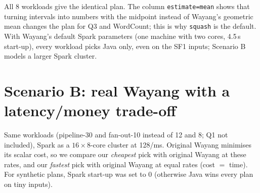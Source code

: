 \documentclass[10pt,a4paper]{article}
\begin{document}
\begin{table}[h]\centering\small
\caption{Scenario A: equal platform rates (Java and Spark at 1/ms), no budget. Picked plan of original Wayang vs.\ ours, compared by the sorted list of all execution operators (hash).}\label{tab:parityA}
\end{table}

\noindent
All 8 workloads give the identical plan. The column \texttt{estimate=mean} shows that turning intervals into numbers
with the midpoint instead of Wayang's geometric mean changes the plan for Q3 and WordCount; this is why
\texttt{squash} is the default. With Wayang's default Spark parameters (one machine with two cores, 4.5\,s start-up),
every workload picks Java only, even on the SF1 inputs; Scenario B models a larger Spark cluster.

\section{Scenario B: real Wayang with a latency/money trade-off}
Same workloads (pipeline-30 and fan-out-10 instead of 12 and 8; Q1 not included), Spark as a $16\times8$-core cluster at
128/ms. Original Wayang minimises its scalar cost, so we compare our \emph{cheapest} pick with original Wayang at
these rates, and our \emph{fastest} pick with original Wayang at equal rates (cost $=$ time). For synthetic plans,
Spark start-up was set to 0 (otherwise Java wins every plan on tiny inputs).
\end{document}
